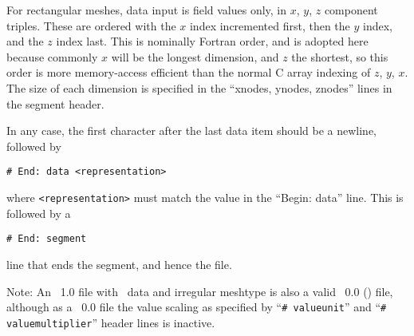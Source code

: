 For rectangular meshes, data input is field values only, in $x$, $y$,
$z$ component triples.  These are ordered with the $x$ index
incremented first, then the $y$ index, and the $z$ index last.  This
is nominally Fortran order, and is adopted here because commonly $x$
will be the longest dimension, and $z$ the shortest, so this order is
more memory-access efficient than the normal C array indexing of $z$,
$y$, $x$.  The size of each dimension is specified in the ``xnodes,
ynodes, znodes'' lines in the segment header.

In any case, the first character after the last data item should be a
newline, followed by
\begin{verbatim}
# End: data <representation>
\end{verbatim}
where \texttt{<representation>} must match the value in the ``Begin:
data'' line.  This is followed by a
\begin{verbatim}
# End: segment
\end{verbatim}
line that ends the segment, and hence the file.

Note: An \OVF~1.0 file with \ASCII\ data and irregular meshtype is
also a valid \OVF~0.0 (\SVF{}) file, although as a
\OVF~0.0 file the value scaling as specified by
``\verb+# valueunit+'' and ``\verb+# valuemultiplier+'' header lines is
inactive.

